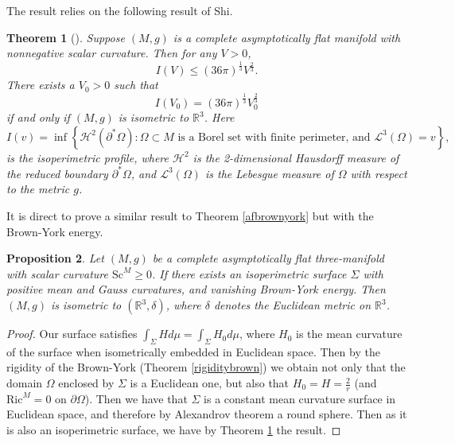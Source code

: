 \documentclass[12pt,a4paper]{amsart}
\theoremstyle{plain}
\newtheorem{theorem}{Theorem}[section]
\newtheorem{proposition}[theorem]{Proposition}
\theoremstyle{definition}
\begin{document}
The result relies on the following result of Shi.
\begin{theorem}[{\cite[Theorem 3]{shi2016isoperimetric}}]\label{isoperig}
    Suppose \((M, g)\) is a complete  asymptotically flat manifold with nonnegative scalar curvature. Then for any  \(V > 0\),
\begin{equation}
I(V) \leq (36\pi)^{\frac{1}{3}} V^{\frac{2}{3}}. 
\end{equation}
There exists a  \(V_0 > 0\) such that
\begin{equation}
I(V_0) = (36\pi)^{\frac{1}{3}} V_0^{\frac{2}{3}} 
\end{equation}
if and only if \((M, g)\) is isometric to \(\mathbb{R}^3\). Here
\[
I(v) = \inf \left\{ \mathcal{H}^2(\partial^* \Omega) : \Omega \subset M \text{ is a Borel set with finite perimeter, and } \mathcal{L}^3(\Omega) = v \right\},
\]
is the isoperimetric profile, where \(\mathcal{H}^2\) is the 2-dimensional Hausdorff measure of the reduced boundary \(\partial^* \Omega\), and \(\mathcal{L}^3(\Omega)\) is the Lebesgue measure of \(\Omega\) with respect to the metric \(g\).
\end{theorem}

It is direct to prove a similar result to Theorem \ref{afbrownyork} but with the Brown-York energy. 


    

\begin{proposition}\label{isobrown}
    Let \((M, g)\) be a complete asymptotically flat  three-manifold with scalar curvature \(\mathrm{Sc}^M \geq 0\). If there exists an isoperimetric surface \(\Sigma\) with positive mean and Gauss curvatures, and vanishing Brown-York energy. Then \((M, g)\) is isometric to \((\mathbb{R}^3, \delta)\), where \(\delta\) denotes the Euclidean metric on \(\mathbb{R}^3\).
\end{proposition}
\begin{proof}
Our surface satisfies $\int_\Sigma H d\mu = \int_\Sigma H_0 d\mu$, where $H_0$ is the mean curvature of the surface when isometrically embedded in Euclidean space. Then by the rigidity of the Brown-York (Theorem \ref{rigiditybrown}) we obtain not only that the domain $\Omega$ enclosed by $\Sigma$ is a Euclidean one,  but also that $H_0= H=\frac{2}{r}$ (and $ \mathrm{Ric}^M=0$ on $\partial \Omega$). Then we have that $\Sigma$ is a constant mean curvature surface in Euclidean space, and therefore by Alexandrov theorem a round sphere. Then as it is also an isoperimetric surface, we have by Theorem \ref{isoperig} the result. 
\end{proof}
\end{document}
